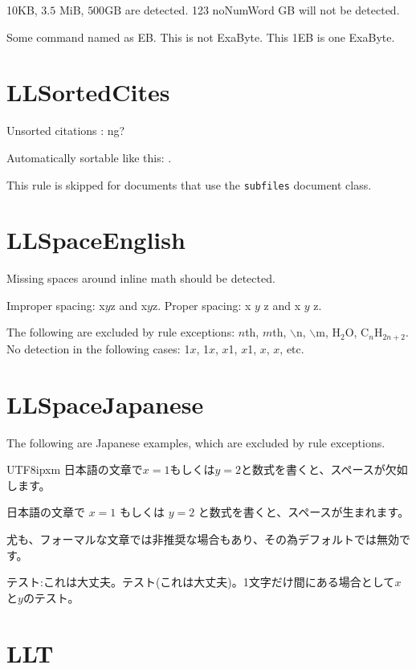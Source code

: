 \documentclass[a4paper]{article}
\newcommand{\tC}[1]{\textcolor{cC}{#1}}
\begin{document}
\newcommand{\EB}{Some command named as EB}

10KB, $3.5$ MiB, $500 \mathrm{GB}$ are detected. 123 noNumWord GB will not be detected.

\EB. This is not ExaByte. This 1EB is one ExaByte.

\section{LLSortedCites}

Unsorted citations \cite{refB,refA}: \tC{ng?}

Automatically sortable like this: \cite{refA,refB}.

This rule is skipped for documents that use the \texttt{subfiles} document class.

\section{LLSpaceEnglish}

Missing spaces around inline math should be detected.

Improper spacing: x\(y\)z and x$y$z.
Proper spacing: x \(y\) z and x $y$ z.

The following are excluded by rule exceptions: $n$th, \(m\)th, $\backslash$n, \(\backslash\)m, H\({}_2\)O, C\({}_{n}\)H\({}_{2n+2}\).\\
No detection in the following cases:  1$x$, 1\(x\), $x$1, \(x\)1, $x$, \(x\), etc.

\section{LLSpaceJapanese}

The following are Japanese examples, which are excluded by rule exceptions.

\begin{CJK}{UTF8}{ipxm}
	日本語の文章で$x=1$もしくは\(y=2\)と数式を書くと、スペースが欠如します。

	日本語の文章で $x=1$ もしくは \(y=2\) と数式を書くと、スペースが生まれます。

	尤も、フォーマルな文章では非推奨な場合もあり、その為デフォルトでは無効です。

	テスト:これは大丈夫。テスト(これは大丈夫)。1文字だけ間にある場合として$x$と$y$のテスト。
\end{CJK}

\section{LLT}
\end{document}
